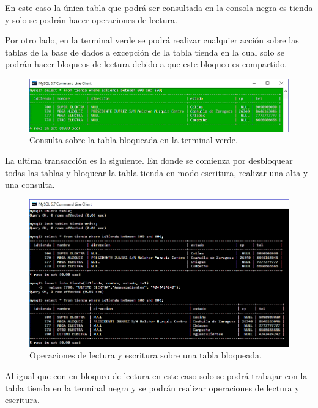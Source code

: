 \documentclass[12pt, titlepage]{article}
\begin{document}
	En este caso la única tabla que podrá ser consultada en la consola negra es tienda y solo se podrán hacer operaciones de lectura.
	
	Por otro lado, en la terminal verde se podrá realizar cualquier acción sobre las tablas de la base de dados a excepción de la tabla tienda en la cual solo se podrán hacer bloqueos de lectura debido a que este bloqueo es compartido.
	
	\begin{figure}[H]
		\begin{center}
			\includegraphics[width=\textwidth]{img/doce.png}
			\caption{Consulta sobre la tabla bloqueada en la terminal verde.}
			\label{fig:doce}
		\end{center}
	\end{figure}
	
	La ultima transacción es la siguiente. En donde se comienza por desbloquear todas las tablas y bloquear la tabla tienda en modo escritura, realizar una alta y una consulta.
	
	\begin{figure}[H]
		\begin{center}
			\includegraphics[width=\textwidth]{img/trece.png}
			\caption{Operaciones de lectura y escritura sobre una tabla bloqueada.}
			\label{fig:trece}
		\end{center}
	\end{figure}

	Al igual que con en bloqueo de lectura en este caso solo se podrá trabajar con la tabla tienda en la terminal negra y se podrán realizar operaciones de lectura y escritura.
	
\end{document}

